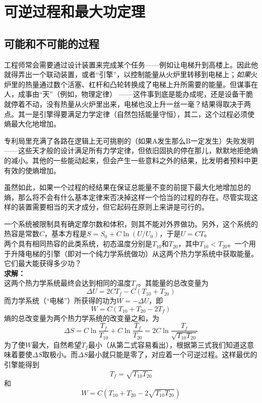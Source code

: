\chapter{可逆过程和最大功定理}\label{chap4}

\section{可能和不可能的过程}\label{sec4.1}

工程师常会需要通过设计装置来完成某个任务——例如让电梯升到高楼上。因此他就得弄出一个联动装置，或者“引擎”，以控制能量从火炉里转移到电梯上；{\it 如果}火炉里的热量通过数个活塞、杠杆和凸轮转换成了电梯上升所需要的能量。但谋事在人，成事由“天”（例如，物理定律）%
%
——这件事到底是能办成呢，还是设备干脆就停着不动，没有热量从火炉里出来，电梯也没上升一丝一毫？结果得取决于两点。其一是引擎得要满足力学定律（自然包括能量守恒），其二，这个过程必须使熵最大化地增加。

专利局里充满了各路在逻辑上无可挑剔的（如果A发生那么B一定发生）失败发明——这些天才般的设计满足所有力学定律，但依旧固执的停在那儿，默默地拒绝熵的减小。其他的一些能动起来，但会产生一些意料之外的结果，比发明者预料中更有效的使熵增加。

虽然如此，如果一个过程的经结果在保证总能量不变的前提下最大化地增加总的熵，那么将不会有什么基本定律来否决掉这样一个恰当的过程的存在。尽管实现这样的装置需要相当的天才成分，但它起码在原则上来讲是可行的。

\begin{example}\label{eg4.1}
一个系统被限制具有确定摩尔数和体积，则其不能对外界做功。另外，这个系统的热容是常数$C$，基本方程是$S=S_0+C\ln(U/U_0)$，于是$U=CT$。\\
两个具有相同热容的此类系统，初态温度分别是$T_{10}$和$T_{20}$，其中$T_{10}<T_{20}$。一个用于升降电梯的引擎（即对一个纯力学系统做功）从这两个热力学系统中获取能量。它们最大能获得多少功？\\
{\bf 求解：}\\
这两个热力学系统最终会达到相同的温度$T_f$。其能量的总改变量为
\[
\Delta U = 2CT_f-C(T_{10}+T_{20})
\]
而力学系统（“电梯”）所获得的功为$W=-\Delta U$，即
\[
W = C(T_{10}+T_{20}-2T_f)
\]
熵的总改变量为两个热力学系统的改变量之和，为
\[
\Delta S = C\ln\frac{T_f}{T_{10}} + C\ln\frac{T_f}{T_{20}} = 2C\ln\frac{T_f}{\sqrt{T_{10}T_{20}}}
\]
为了使$W$最大，自然希望$T_f$最小（从第二式容易看出），根据第三式我们知道这意味着要使$\Delta S$取极小。而$\Delta S$最小就只能是零了，对应着一个可逆过程。这样最优的引擎能得到
\[
T_f = \sqrt{T_{10}T_{20}}
\]
和
\[
W = C(T_{10}+T_{20}-2\sqrt{T_{10}T_{20}})
\]
\end{example}


